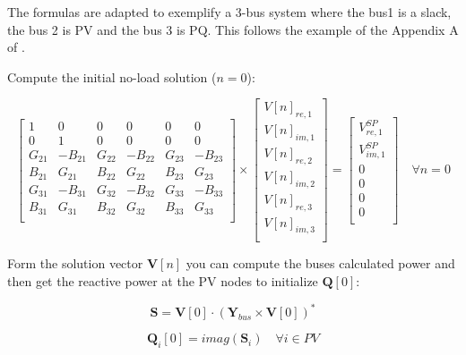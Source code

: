 \documentclass[a4paper,twoside,fleqn]{tufte-book}
\begin{document}
The formulas are adapted to exemplify a 3-bus system where the bus1 is a slack, the bus 2 is PV and the bus 3 is PQ. This follows the example of the Appendix A of \cite{liu2017online}.

\vspace{1cm}

Compute the initial no-load solution ($n=0$):

\begin{equation}
\begin{bmatrix}
1 & 0 & 0 & 0 & 0 & 0\\
0 & 1 & 0 & 0 & 0 & 0\\
G_{21} & -B_{21} & G_{22} & -B_{22} & G_{23} & -B_{23}\\
B_{21} & G_{21}  & B_{22} & G_{22}  & B_{23} & G_{23}\\
G_{31} & -B_{31} & G_{32} & -B_{32} & G_{33} & -B_{33}\\
B_{31} & G_{31}  & B_{32} & G_{32}  & B_{33} & G_{33}\\
\end{bmatrix}
\times
\begin{bmatrix}
V[n]_{re, 1}\\
V[n]_{im, 1}\\
V[n]_{re, 2}\\
V[n]_{im, 2}\\
V[n]_{re, 3}\\
V[n]_{im, 3}\\
\end{bmatrix}
=
\begin{bmatrix}
V^{SP}_{re, 1}\\
V^{SP}_{im, 1}\\
0\\
0\\
0\\
0\\
\end{bmatrix}
\quad \forall n = 0
\end{equation}

Form the solution vector $\textbf{V}[n]$ you can compute the buses calculated power and then get the reactive power at the PV nodes to initialize $\textbf{Q}[0]$:

\begin{equation}
\textbf{S} = \textbf{V}[0] \cdot (\textbf{Y}_{bus} \times \textbf{V}[0])^*
\label{Scalc}
\end{equation}

\begin{equation}
\textbf{Q}_i[0] = imag(\textbf{S}_{i}) \quad \forall i \in PV
\end{equation}
\end{document}
